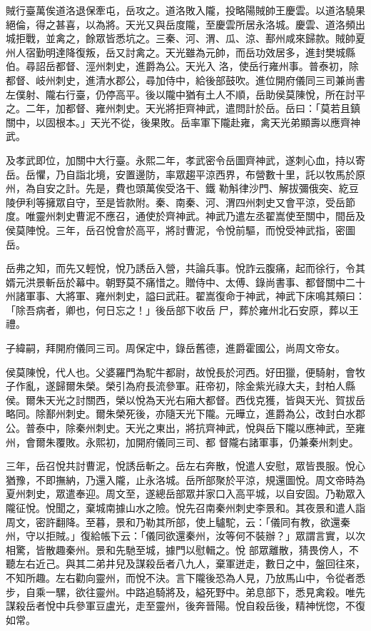 \begin{pinyinscope}
 賊行臺萬俟道洛退保牽屯，岳攻之。道洛敗入隴，投略陽賊帥王慶雲。以道洛驍果絕倫，得之甚喜，以為將。天光又與岳度隴，至慶雲所居永洛城。慶雲、道洛頻出城拒戰，並禽之，餘眾皆悉坑之。三秦、河、渭、瓜、涼、鄯州咸來歸款。賊帥夏州人宿勤明達降復叛，岳又討禽之。天光雖為元帥，而岳功效居多，進封樊城縣伯。尋詔岳都督、涇州刺史，進爵為公。天光入
 洛，使岳行雍州事。普泰初，除都督、岐州刺史，進清水郡公，尋加侍中，給後部鼓吹。進位開府儀同三司兼尚書左僕射、隴右行臺，仍停高平。後以隴中猶有土人不順，岳助侯莫陳悅，所在討平之。二年，加都督、雍州刺史。天光將拒齊神武，遣問計於岳。岳曰：「莫若且鎮關中，以固根本。」天光不從，後果敗。岳率軍下隴赴雍，禽天光弟顯壽以應齊神武。



 及孝武即位，加關中大行臺。永熙二年，孝武密令岳圖齊神武，遂刺心血，持以寄岳。岳懼，乃自詣北境，安置邊防，率眾趨平涼西界，布營數十里，託以牧馬於原州，為自安之計。先是，費也頭萬俟受洛干、鐵
 勒斛律沙門、解拔彌俄突、紇豆陵伊利等擁眾自守，至是皆款附。秦、南秦、河、渭四州刺史又會平涼，受岳節度。唯靈州刺史曹泥不應召，通使於齊神武。神武乃遣左丞翟嵩使至關中，間岳及侯莫陣悅。三年，岳召悅會於高平，將討曹泥，令悅前驅，而悅受神武指，密圖岳。



 岳弗之知，而先又輕悅，悅乃誘岳入營，共論兵事。悅詐云腹痛，起而徐行，令其婿元洪景斬岳於幕中。朝野莫不痛惜之。贈侍中、太傅、錄尚書事、都督關中二十州諸軍事、大將軍、雍州刺史，謚曰武莊。翟嵩復命于神武，神武下床鳴其頰曰：「除吾病者，卿也，何日忘之！」後岳部下收岳
 尸，葬於雍州北石安原，葬以王禮。



 子緯嗣，拜開府儀同三司。周保定中，錄岳舊德，進爵霍國公，尚周文帝女。



 侯莫陳悅，代人也。父婆羅門為駝牛都尉，故悅長於河西。好田獵，便騎射，會牧子作亂，遂歸爾朱榮。榮引為府長流參軍。莊帝初，除金紫光祿大夫，封柏人縣侯。爾朱天光之討關西，榮以悅為天光右廂大都督。西伐克獲，皆與天光、賀拔岳略同。除鄯州刺史。爾朱榮死後，亦隨天光下隴。元曄立，進爵為公，改封白水郡公。普泰中，除秦州刺史。天光之東出，將抗齊神武，悅與岳下隴以應神武，至雍州，會爾朱覆敗。永熙初，加開府儀同三司、都
 督隴右諸軍事，仍兼秦州刺史。



 三年，岳召悅共討曹泥，悅誘岳斬之。岳左右奔散，悅遣人安慰，眾皆畏服。悅心猶豫，不即撫納，乃還入隴，止永洛城。岳所部聚於平涼，規還圖悅。周文帝時為夏州刺史，眾遣奉迎。周文至，遂總岳部眾并家口入高平城，以自安固。乃勒眾入隴征悅。悅聞之，棄城南據山水之險。悅先召南秦州刺史李景和。其夜景和遣人詣周文，密許翻降。至暮，景和乃勒其所部，使上驢駝，云：「儀同有教，欲還秦州，守以拒賊。」復給帳下云：「儀同欲還秦州，汝等何不裝辦？」眾謂言實，以次相驚，皆散趣秦州。景和先馳至城，據門以慰輯之。悅
 部眾離散，猜畏傍人，不聽左右近己。與其二弟井兒及謀殺岳者八九人，棄軍迸走，數日之中，盤回往來，不知所趣。左右勸向靈州，而悅不決。言下隴後恐為人見，乃放馬山中，令從者悉步，自乘一騾，欲往靈州。中路追騎將及，縊死野中。弟息部下，悉見禽殺。唯先謀殺岳者悅中兵參軍豆盧光，走至靈州，後奔晉陽。悅自殺岳後，精神恍惚，不復如常。




\end{pinyinscope}
